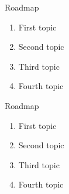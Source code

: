 \documentclass{beamer}
\begin{document}
\begin{frame}{Roadmap}
\begin{enumerate}
\item First topic
\item Second topic
\item Third topic
\item Fourth topic
\end{enumerate}
\end{frame}

\begin{frame}[shrink=20]{Roadmap}
\begin{enumerate}
\item First topic
\item Second topic
\item Third topic
\item Fourth topic
\end{enumerate}
\end{frame}
\end{document}
